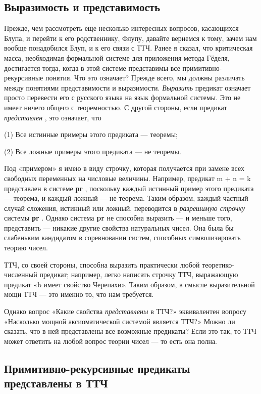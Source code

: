 \documentclass[../main.tex]{subfiles}
\begin{document}
\subsection{Выразимость и представимость}

Прежде, чем рассмотреть еще несколько интересных вопросов, касающихся Блупа, и перейти к его родственнику, Флупу, давайте вернемся к тому, зачем нам вообще понадобился Блуп, и к его связи с ТТЧ\@. Ранее я сказал, что критическая масса, необходимая формальной системе для приложения метода Гёделя, достигается тогда, когда в этой системе представимы все примитивно-рекурсивные понятия. Что это означает? Прежде всего, мы должны различать между понятиями представимости и выразимости. \emph{Выразить} предикат означает просто перевести его с русского языка на язык формальной системы. Это не имеет ничего общего с теоремностью. С другой стороны, если предикат \emph{представлен} , это означает, что

(1) Все истинные примеры этого предиката --- теоремы;

(2) Все ложные примеры этого предиката --- не теоремы.

Под «примером» я имею в виду строчку, которая получается при замене всех свободных переменных на числовые величины. Например, предикат m + n = k представлен в системе \textbf{рr} , поскольку каждый истинный пример этого предиката --- теорема, и каждый ложный --- не теорема. Таким образом, каждый частный случай сложения, истинный или ложный, переводится в \emph{разрешимую строчку} системы \textbf{рr} . Однако система \textbf{pr} не способна выразить --- и меньше того, представить --- никакие другие свойства натуральных чисел. Она была бы слабеньким кандидатом в соревновании систем, способных символизировать теорию чисел.

ТТЧ, со своей стороны, способна выразить практически любой теоретико-численный предикат; например, легко написать строчку ТТЧ, выражающую предикат «b имеет свойство Черепахи». Таким образом, в смысле выразительной мощи ТТЧ --- это именно то, что нам требуется.

Однако вопрос «Какие свойства \emph{представлены} в ТТЧ?» эквивалентен вопросу «Насколько мощной аксиоматической системой является ТТЧ?» Можно ли сказать, что в ней представлены все возможные предикаты? Если это так, то ТТЧ может ответить на любой вопрос теории чисел --- то есть она полна.


\subsection{Примитивно-рекурсивные предикаты представлены в ТТЧ}
\end{document}
